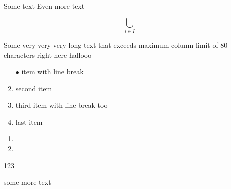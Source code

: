 \documentclass{paper}
\begin{document}
Some text
Even more text

\[
	\bigcup_{i \in I}
\]

Some very very very long text that exceeds maximum column limit of 80
characters right here hallooo

\begin{enumerate}
	\item[$\bullet$] item
	      with line break
	\item second item
	\item third item
	      with line break too
	\item last item
\end{enumerate}

\begin{enumerate}
	\item
	\item
\end{enumerate}

123

some more text
\end{document}
